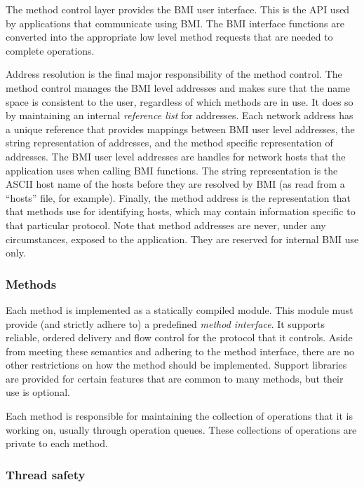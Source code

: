 \documentclass[11pt]{article}
\begin{document}
The method control layer provides the BMI user interface.  This is
the API used by applications that communicate using BMI.  The BMI
interface functions are converted into the appropriate low level method
requests that are needed to complete operations.

Address resolution is the final major responsibility of the method
control.  The method control manages the BMI level addresses and makes
sure that the
name space is consistent to the user, regardless of which methods are
in use.  It does so by maintaining an internal \emph{reference list} for
addresses.  Each network address has a unique reference that provides
mappings between BMI user level addresses, the string representation
of addresses, and the method specific representation of addresses.
The BMI user level addresses are handles for network hosts that the
application uses when calling BMI functions.  The string representation
is the ASCII host name of the hosts before they are resolved by BMI (as
read from a ``hosts'' file, for example).
Finally, the method address is the representation that that methods use
for identifying hosts, which may contain information specific
to that particular protocol.  Note that method addresses are never,
under any circumstances, exposed to the application.  They are
reserved for internal BMI use only.

\subsubsection{Methods}

Each method is implemented as a statically compiled module.  This
module must provide (and strictly adhere to) a predefined \emph{method
interface}.  It supports reliable, ordered delivery and flow control for
the protocol that it controls.  Aside from meeting these semantics and
adhering to the method interface, there are no other restrictions on
how the method should be implemented.  Support libraries are provided
for certain features that are common to many methods, but their use
is optional.

Each method is responsible for maintaining the collection of
operations that it is working on, usually through operation queues.
These collections of operations are private to each method.

\subsubsection{Thread safety}
\end{document}
